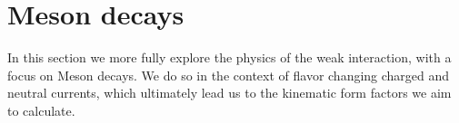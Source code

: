 

    

\section{Meson decays}\label{sec:weak_decays}
In this section we more fully explore the physics of the weak interaction, with a focus on Meson decays.  We do so in the context of flavor changing charged and neutral currents, which ultimately lead us to the kinematic form factors we aim to calculate. 

